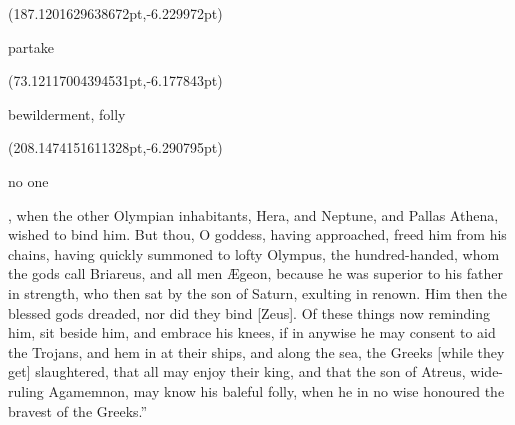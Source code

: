 \documentclass{ransom}
\begin{document}
\begin{foreignpage}
{\begin{textblock*}{60.30128pt}(187.1201629638672pt,\pdfpageheight-260.3775939941406pt-6.229972pt)\parbox[b]{60.30128pt}{\begin{blacktext}\begin{latin}partake\end{latin}\end{blacktext}}\end{textblock*}
\begin{textblock*}{24.15527pt}(73.12117004394531pt,\pdfpageheight-206.37759399414062pt-6.177843pt)\parbox[b]{24.15527pt}{\begin{blacktext}\begin{latin}bewilderment, folly\end{latin}\end{blacktext}}\end{textblock*}
\begin{textblock*}{27.01021pt}(208.1474151611328pt,\pdfpageheight-206.37759399414062pt-6.290795pt)\parbox[b]{27.01021pt}{\begin{blacktext}\begin{latin}no one\end{latin}\end{blacktext}}\end{textblock*}
 }
\end{foreignpage}


, when the
other Olympian inhabitants, Hera, and Neptune, and Pallas Athena,
wished to bind him. But thou, O goddess, having approached, freed him
from his chains, having quickly summoned to lofty Olympus, the
hundred-handed, whom the gods call Briareus, and all men Ægeon, because
he was superior to his father in strength, who then sat by the son
of Saturn, exulting in renown. Him then the blessed gods dreaded, nor
did they bind [Zeus]. Of these things now reminding him, sit beside
him, and embrace his knees, if in anywise he may consent to aid the
Trojans, and hem in at their ships, and along the sea, the Greeks
[while they get] slaughtered, that all may enjoy their king, and that
the son of Atreus, wide-ruling Agamemnon, may know his baleful folly, when he in no wise honoured the bravest of the Greeks.”
\end{document}
